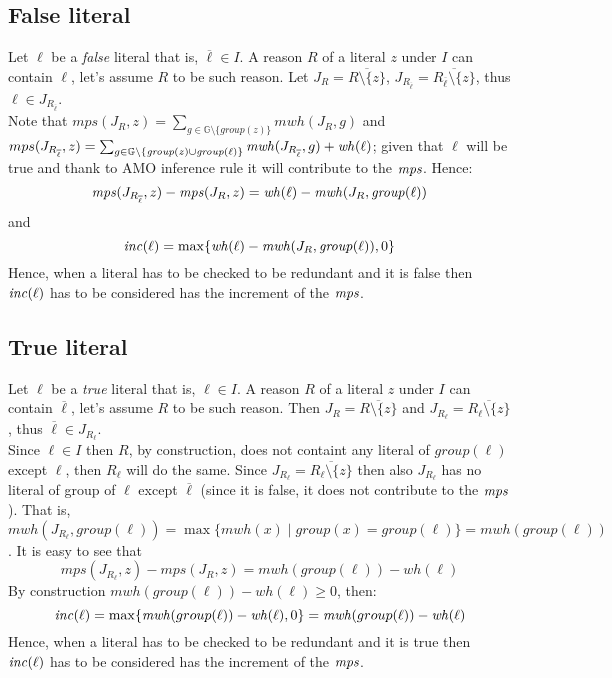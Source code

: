 \subsection{False literal}
Let $\ell$ be a \textit{false} literal that is,
$\overline{\ell} \in I$. 
A reason $R$ of a literal $z$ under $I$ can contain $\ell$, let's assume $R$ to be 
such reason.
Let $J_R = \overline{R \setminus \{z\}}$, 
$J_{R_{\overline{\ell}}} = \overline{R_{\overline{\ell}} \setminus \{z\}}$, thus
$\ell \in J_{R_{\overline{\ell}}}$.\\
Note that $mps(J_R,z) = \sum_{g \in \mathbb{G} \setminus
\{\mathit{group}(z)\}}{\mathit{mwh}(J_R,g)}$ and \\
$mps(J_{R_{\overline{\ell}}},z) = \sum_{g \in \mathbb{G} \setminus
\{\mathit{group}(z) \cup \mathit{group}(\ell)\}}
{\mathit{mwh}(J_{R_{\overline{\ell}}},g) + \mathit{wh}(\ell)}$;
given that $\ell$ will be true and thank to AMO inference rule it will 
contribute to the $\mathit{mps}$.
Hence: $$\mathit{mps}(J_{R_{\overline{\ell}}},z)-\mathit{mps}(J_R,z) = 
\mathit{wh}(\ell) - \mathit{mwh}(J_R,\mathit{group}(\ell))$$ and 
$$ \mathit{inc}(\ell) = \max\{\mathit{wh}(\ell) - \mathit{mwh}(J_R,\mathit{group}(\ell)),0\}$$
Hence, when a literal has to be checked to be redundant and it is false then 
$\mathit{inc}(\ell)$ has to be considered has the increment of the $\mathit{mps}$.

\subsection{True literal}
Let $\ell$ be a \textit{true} literal that is,
$\ell \in I$. 
A reason $R$ of a literal $z$ under $I$ can contain $\overline{\ell}$, let's assume $R$ to be 
such reason.
Then  $J_R = \overline{R \setminus \{z\}}$ and $J_{R_{\ell}} = \overline{R_{\ell} \setminus \{z\}}$, thus
$\overline{\ell} \in J_{R_{\ell}}$.\\ 
Since $\ell \in I$ then $R$, by construction, does not containt any literal of $group(\ell)$ 
except $\ell$, then $R_{\ell}$ will do the same.
Since $J_{R_{\ell}} = \overline{R_{\ell} \setminus \{z\}}$ then also $J_{R_{\ell}}$ 
has no literal of group of $\ell$
except $\overline{\ell}$ (since it is false, it does not contribute to the $\mathit{mps}$).
That is, $\mathit{mwh}(J_{R_{\ell}},group(\ell))= \max\{ \mathit{mwh}(x) \mid \mathit{group}(x) = group(\ell) \} 
= \mathit{mwh}(group(\ell))$.
It is easy to see that
$$\mathit{mps}(J_{R_{\ell}},z)-\mathit{mps}(J_R,z) = \mathit{mwh}(group(\ell)) - \mathit{wh}(\ell)$$
By construction $\mathit{mwh}(group(\ell)) - \mathit{wh}(\ell) \ge 0$, then:
$$\mathit{inc}(\ell) = \max\{\mathit{mwh}(group(\ell)) - \mathit{wh}(\ell),0\} = \mathit{mwh}(group(\ell)) - \mathit{wh}(\ell)$$
Hence, when a literal has to be checked to be redundant and it is true then 
$\mathit{inc}(\ell)$ has to be considered has the increment of the $\mathit{mps}$.

